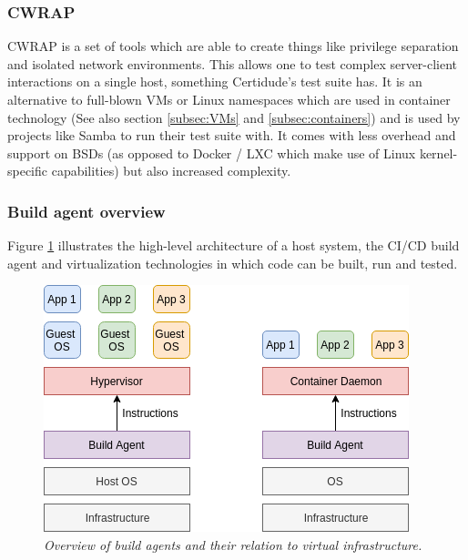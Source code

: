 \subsubsection{CWRAP}
CWRAP is a set of tools which are able to create things like privilege separation and isolated network environments.\cite{cwrap} This allows one to test complex server-client interactions on a single host, something Certidude's test suite has. It is an alternative to full-blown VMs or Linux namespaces which are used in container technology (See also section \ref{subsec:VMs} and \ref{subsec:containers}) and is used by projects like Samba to run their test suite with. It comes with less overhead and support on BSDs (as opposed to Docker / LXC which make use of Linux kernel-specific capabilities) but also increased complexity.\cite{cwrap2, cwrap3, cwrap4}

\pagebreak

\subsubsection{Build agent overview}
Figure \ref{fig:build-agents} illustrates the high-level architecture of a host system, the CI/CD build agent and virtualization technologies in which code can be built, run and tested.

\begin{figure}[H]
    \centering
    \includegraphics[width=.7\textwidth]{figures/drawio/build-agent.png}
    \caption{\textit{Overview of build agents and their relation to virtual infrastructure.}}
    \label{fig:build-agents} 
\end{figure} 


